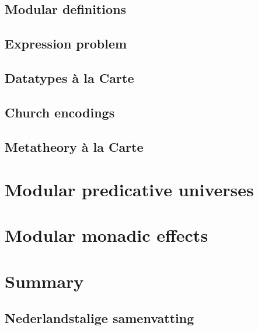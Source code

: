 \documentclass[final,twoside]{book}
\begin{document}
\section{Modular definitions}

\section{Expression problem}
\section{Datatypes \`a la Carte}
\section{Church encodings}
\section{Metatheory \`a la Carte}

\chapter{Modular predicative universes}







\chapter{Modular monadic effects}













\backmatter

\chapter{Summary}


\begin{otherlanguage}{dutch}
\chapter{Nederlandstalige samenvatting}

\end{otherlanguage}
\end{document}
